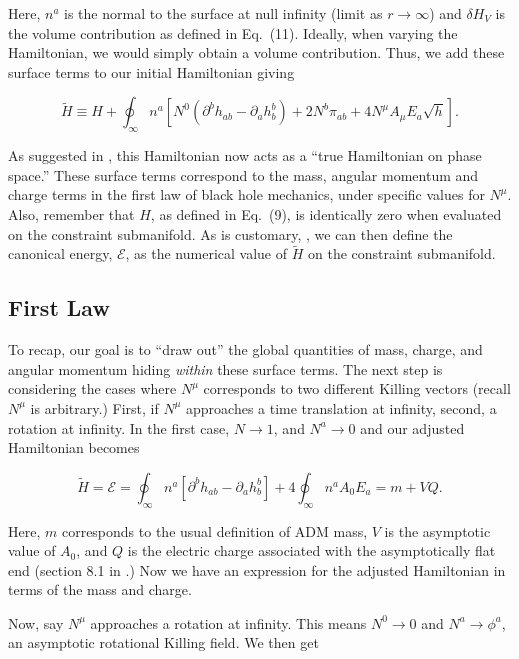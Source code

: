 \documentclass[titlepage]{article}
\def\beq{\begin{equation}}
\def\eeq{\end{equation}}
\begin{document}
\noindent
Here, $n^a$ is the normal to the surface at null infinity (limit as $r\rightarrow \infty$) and $\delta H_V$ is the volume contribution as defined in Eq.\ (11).  Ideally, when varying the Hamiltonian, we would simply obtain a volume contribution.  Thus, we add these surface terms to our initial Hamiltonian giving

\beq
\tilde H \equiv H + \oint_{\infty}n^a\left[N^0\left( \partial^b h_{ab} - \partial_a h^b_b \right) + 2 N^b  \pi_{ab} + 4 N^\mu A_\mu E_a \sqrt{h} \right] .
\eeq

\noindent
As suggested in \cite{wald1993first}, this Hamiltonian now acts as a ``true Hamiltonian on phase space.''  These surface terms correspond to the mass, angular momentum and charge terms in the first law of black hole mechanics, under specific values for $N^\mu$.  Also, remember that $H$, as defined in Eq.\ (9), is identically zero when evaluated on the constraint submanifold.  As is customary, \cite{sudarskyExtrema92}, we can then define the canonical energy, $\mathcal{E}$, as the numerical value of $\tilde H $ on the constraint submanifold.

\subsection{First Law}

\noindent
To recap, our goal is to ``draw out'' the global quantities of mass, charge, and angular momentum hiding \emph{within} these surface terms.  The next step is considering the cases where $N^\mu$ corresponds to two different Killing vectors (recall $N^\mu$ is arbitrary.) First, if $N^\mu$ approaches a time translation at infinity, second, a rotation at infinity.  In the first case, $N\rightarrow 1$, and $N^a\rightarrow 0$ and our adjusted Hamiltonian becomes

\beq
\tilde{H} = \mathcal{E} = \oint_{\infty}n^a \left[ \partial^b h_{ab} - \partial_a h^b_b \right] + 4 \oint_{\infty}n^a  A_0 E_a = m + VQ .
\eeq

\noindent
Here, $m$ corresponds to the usual definition of ADM mass, $V$ is the asymptotic value of $A_0$, and $Q$ is the electric charge associated with the asymptotically flat end (section 8.1 in \cite{ReallNotes}.)  Now we have an expression for the adjusted Hamiltonian in terms of the mass and charge.

Now, say $N^\mu$ approaches a rotation at infinity.  This means $N^0\rightarrow 0$ and $N^a\rightarrow \phi^a$, an asymptotic rotational Killing field.  We then get 
\end{document}

